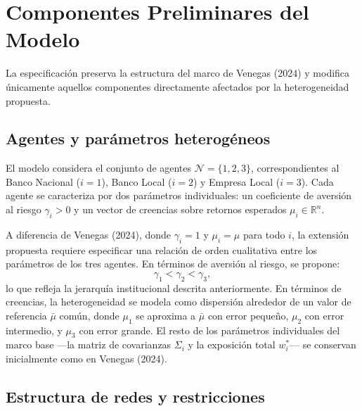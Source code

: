 \documentclass[12pt,a4paper]{article}
\begin{document}
\section*{Componentes Preliminares del Modelo}

La especificación preserva la estructura del marco de Venegas (2024) y modifica únicamente
aquellos componentes directamente afectados por la heterogeneidad propuesta.

\subsection{Agentes y parámetros heterogéneos}

El modelo considera el conjunto de agentes $\mathcal{N} = \{1, 2, 3\}$, correspondientes al
Banco Nacional ($i = 1$), Banco Local ($i = 2$) y Empresa Local ($i = 3$). Cada agente se
caracteriza por dos parámetros individuales: un coeficiente de aversión al riesgo $\gamma_i > 0$
y un vector de creencias sobre retornos esperados $\mu_i \in \mathbb{R}^n$.

A diferencia de Venegas (2024), donde $\gamma_i = 1$ y $\mu_i = \mu$ para todo $i$, la
extensión propuesta requiere especificar una relación de orden cualitativa entre los parámetros
de los tres agentes. En términos de aversión al riesgo, se propone:
\begin{equation}
    \gamma_1 < \gamma_2 < \gamma_3,
\end{equation}
lo que refleja la jerarquía institucional descrita anteriormente. En términos de creencias, la
heterogeneidad se modela como dispersión alrededor de un valor de referencia $\bar{\mu}$
común, donde $\mu_1$ se aproxima a $\bar{\mu}$ con error pequeño, $\mu_2$ con error
intermedio, y $\mu_3$ con error grande. El resto de los parámetros individuales del marco base
—la matriz de covarianzas $\Sigma_i$ y la exposición total $w_i^*$— se conservan inicialmente
como en Venegas (2024).

\subsection{Estructura de redes y restricciones}
\end{document}
